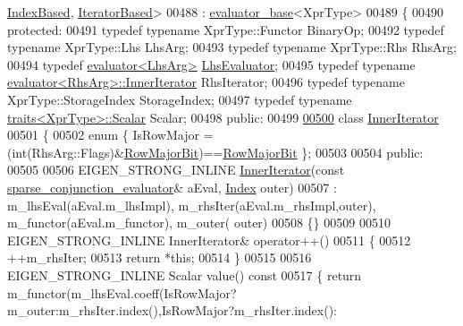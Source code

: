 \begin{DoxyCode}
      \hyperlink{struct_eigen_1_1internal_1_1_index_based}{IndexBased}, \hyperlink{struct_eigen_1_1internal_1_1_iterator_based}{IteratorBased}>
00488   : \hyperlink{struct_eigen_1_1internal_1_1evaluator__base}{evaluator\_base}<XprType>
00489 \{
00490 \textcolor{keyword}{protected}:
00491   \textcolor{keyword}{typedef} \textcolor{keyword}{typename} XprType::Functor BinaryOp;
00492   \textcolor{keyword}{typedef} \textcolor{keyword}{typename} XprType::Lhs LhsArg;
00493   \textcolor{keyword}{typedef} \textcolor{keyword}{typename} XprType::Rhs RhsArg;
00494   \textcolor{keyword}{typedef} \hyperlink{struct_eigen_1_1internal_1_1evaluator}{evaluator<LhsArg>} \hyperlink{struct_eigen_1_1internal_1_1evaluator}{LhsEvaluator};
00495   \textcolor{keyword}{typedef} \textcolor{keyword}{typename} \hyperlink{struct_eigen_1_1internal_1_1evaluator}{evaluator<RhsArg>::InnerIterator}  RhsIterator;
00496   \textcolor{keyword}{typedef} \textcolor{keyword}{typename} XprType::StorageIndex StorageIndex;
00497   \textcolor{keyword}{typedef} \textcolor{keyword}{typename} \hyperlink{struct_eigen_1_1internal_1_1traits}{traits<XprType>::Scalar} Scalar;
00498 \textcolor{keyword}{public}:
00499 
\hyperlink{class_eigen_1_1internal_1_1sparse__conjunction__evaluator_3_01_xpr_type_00_01_index_based_00_01_a04df7f6b82f87bde9590608a6f941de}{00500}   \textcolor{keyword}{class }\hyperlink{class_eigen_1_1_inner_iterator}{InnerIterator}
00501   \{
00502     \textcolor{keyword}{enum} \{ IsRowMajor = (int(RhsArg::Flags)&\hyperlink{group__flags_gae4f56c2a60bbe4bd2e44c5b19cbe8762}{RowMajorBit})==\hyperlink{group__flags_gae4f56c2a60bbe4bd2e44c5b19cbe8762}{RowMajorBit} \};
00503 
00504   \textcolor{keyword}{public}:
00505     
00506     EIGEN\_STRONG\_INLINE \hyperlink{class_eigen_1_1_inner_iterator}{InnerIterator}(\textcolor{keyword}{const} 
      \hyperlink{struct_eigen_1_1internal_1_1sparse__conjunction__evaluator}{sparse\_conjunction\_evaluator}& aEval, \hyperlink{namespace_eigen_a62e77e0933482dafde8fe197d9a2cfde}{Index} outer)
00507       : m\_lhsEval(aEval.m\_lhsImpl), m\_rhsIter(aEval.m\_rhsImpl,outer), m\_functor(aEval.m\_functor), m\_outer(
      outer)
00508     \{\}
00509 
00510     EIGEN\_STRONG\_INLINE InnerIterator& operator++()
00511     \{
00512       ++m\_rhsIter;
00513       \textcolor{keywordflow}{return} *\textcolor{keyword}{this};
00514     \}
00515 
00516     EIGEN\_STRONG\_INLINE Scalar value()\textcolor{keyword}{ const}
00517 \textcolor{keyword}{    }\{ \textcolor{keywordflow}{return} m\_functor(m\_lhsEval.coeff(IsRowMajor?m\_outer:m\_rhsIter.index(),IsRowMajor?m\_rhsIter.index():

\end{DoxyCode}
